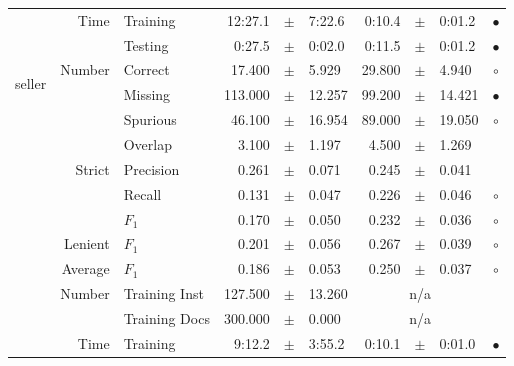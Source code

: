 \begin{longtable}{|r|r|l||rcl|rcl|c|}
\cline{2-10} & \multirow{2}{*}{      Time} &        Training &     12:27.1 &  $\pm$  &      7:22.6 &      0:10.4 &  $\pm$  &      0:01.2 & $\bullet$ \\
\cline{3-10} &                             &         Testing &      0:27.5 &  $\pm$  &      0:02.0 &      0:11.5 &  $\pm$  &      0:01.2 & $\bullet$ \\
\hline
\hline
\multirow{11}{*}{\begin{sideways}seller\end{sideways} }
             & \multirow{4}{*}{    Number} &         Correct &      17.400 &  $\pm$  &       5.929 &      29.800 &  $\pm$  &       4.940 & $\circ$ \\
\cline{3-10} &                             &         Missing &     113.000 &  $\pm$  &      12.257 &      99.200 &  $\pm$  &      14.421 & $\bullet$ \\
\cline{3-10} &                             &        Spurious &      46.100 &  $\pm$  &      16.954 &      89.000 &  $\pm$  &      19.050 & $\circ$ \\
\cline{3-10} &                             &         Overlap &       3.100 &  $\pm$  &       1.197 &       4.500 &  $\pm$  &       1.269 &  \\
\cline{2-10} & \multirow{3}{*}{    Strict} &       Precision &       0.261 &  $\pm$  &       0.071 &       0.245 &  $\pm$  &       0.041 &  \\
\cline{3-10} &                             &          Recall &       0.131 &  $\pm$  &       0.047 &       0.226 &  $\pm$  &       0.046 & $\circ$ \\
\cline{3-10} &                             &           $F_1$ &       0.170 &  $\pm$  &       0.050 &       0.232 &  $\pm$  &       0.036 & $\circ$ \\
\cline{2-10} &                     Lenient &           $F_1$ &       0.201 &  $\pm$  &       0.056 &       0.267 &  $\pm$  &       0.039 & $\circ$ \\
\cline{2-10} &                     Average &           $F_1$ &       0.186 &  $\pm$  &       0.053 &       0.250 &  $\pm$  &       0.037 & $\circ$ \\
\cline{2-10} & \multirow{2}{*}{    Number} &   Training Inst &     127.500 &  $\pm$  &      13.260 &    \multicolumn{3}{c|}{n/a}         &  \\
\cline{3-10} &                             &   Training Docs &     300.000 &  $\pm$  &       0.000 &    \multicolumn{3}{c|}{n/a}         &  \\
\cline{2-10} & \multirow{2}{*}{      Time} &        Training &      9:12.2 &  $\pm$  &      3:55.2 &      0:10.1 &  $\pm$  &      0:01.0 & $\bullet$ \\

\end{longtable}

